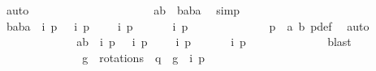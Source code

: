 \begin{isabellebody}
\ auto\ \ \ \ \ \ \ \ \isanewline
\ \ \ \ \ \ \ \ \ \ \isamarkupfalse%
\ \isamarkupfalse%
\ {\isachardoublequoteopen}{\isacharparenleft}a{}{\isacharcomma}b{}{\isacharparenright}\ {\isasymin}\ {\isacharbraceleft}{\isacharparenleft}b{}{\isacharcomma}a{}{\isacharparenright}{\isacharcomma}{\isacharparenleft}{\isacharminus}b{}{\isacharcomma}{\isacharminus}a{}{\isacharparenright}{\isacharbraceright}{\isachardoublequoteclose}\ \isamarkupfalse%
\ simp\isanewline
\ \ \ \ \ \ \ \ \ \ \isamarkupfalse%
\ \isamarkupfalse%
\ {\isachardoublequoteopen}{\isacharbraceleft}{\isacharparenleft}b{}{\isacharcomma}a{}{\isacharparenright}{\isacharcomma}{\isacharparenleft}{\isacharminus}b{}{\isacharcomma}{\isacharminus}a{}{\isacharparenright}{\isacharbraceright}\ {\isasymsubseteq}\ {\isacharbraceleft}i\ p{\isacharcomma}\ {\isacharparenleft}{\isasymrho}\ {\isasymcirc}\ i{\isacharparenright}\ p{\isacharcomma}\ {\isacharparenleft}{\isasymrho}\ {\isasymcirc}\ {\isasymrho}\ {\isasymcirc}\ i{\isacharparenright}\ p{\isacharcomma}\ {\isacharparenleft}{\isasymrho}\ {\isasymcirc}\ {\isasymrho}\ {\isasymcirc}\ {\isasymrho}\ {\isasymcirc}\ i{\isacharparenright}\ p{\isacharbraceright}{\isachardoublequoteclose}\isanewline
\ \ \ \ \ \ \ \ \ \ \ \ \isamarkupfalse%
\ {\isacartoucheopen}p\ {\isacharequal}\ {\isacharparenleft}a{}{\isacharcomma}\ b{}{\isacharparenright}{\isacartoucheclose}\ p{\isacharunderscore}def\ \isamarkupfalse%
\ auto\isanewline
\ \ \ \ \ \ \ \ \ \ \isamarkupfalse%
\ \isamarkupfalse%
\ {\isachardoublequoteopen}{\isacharparenleft}a{}{\isacharcomma}b{}{\isacharparenright}\ {\isasymin}\ {\isacharbraceleft}i\ p{\isacharcomma}\ {\isacharparenleft}{\isasymrho}\ {\isasymcirc}\ i{\isacharparenright}\ p{\isacharcomma}\ {\isacharparenleft}{\isasymrho}\ {\isasymcirc}\ {\isasymrho}\ {\isasymcirc}\ i{\isacharparenright}\ p{\isacharcomma}\ {\isacharparenleft}{\isasymrho}\ {\isasymcirc}\ {\isasymrho}\ {\isasymcirc}\ {\isasymrho}\ {\isasymcirc}\ i{\isacharparenright}\ p{\isacharbraceright}{\isachardoublequoteclose}\isanewline
\ \ \ \ \ \ \ \ \ \ \ \ \isamarkupfalse%
\ blast\isanewline
\ \ \ \ \ \ \ \ \ \ \isamarkupfalse%
\ \isamarkupfalse%
\ {\isachardoublequoteopen}{\isacharparenleft}{\isasymexists}\ g\ {\isasymin}\ rotations{\isachardot}\ {\isasymtau}\ q\ {\isacharequal}\ {\isacharparenleft}g\ {\isasymcirc}\ i{\isacharparenright}\ p{\isacharparenright}{\isachardoublequoteclose}\isanewline

\end{isabellebody}

